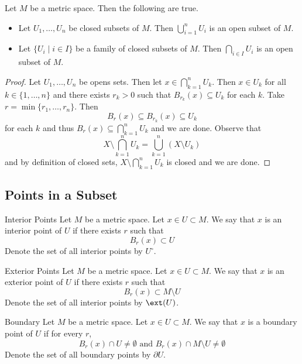 \documentclass[a4paper]{article}
\begin{document}
\begin{prp}{}{} Let $M$ be a metric space. Then the following are true. 
\begin{itemize}
\item Let $U_1,\dots,U_n$ be closed subsets of $M$. Then $\bigcup_{i=1}^nU_i$ is an open subset of $M$. 
\item Let $\{U_i\;|\;i\in I\}$ be a family of closed subsets of $M$. Then $\bigcap_{i\in I}U_i$ is an open subset of $M$. 
\end{itemize} \tcbline
\begin{proof}
Let $U_1,\dots,U_n$ be opens sets. Then let $x\in\bigcap_{k=1}^nU_k$. Then $x\in U_k$ for all $k\in\{1,\dots,n\}$ and there exists $r_k>0$ such that $B_{r_k}(x)\subseteq U_k$ for each $k$. Take $r=\min\{r_1,\dots,r_n\}$. Then $$B_r(x)\subseteq B_{r_k}(x)\subseteq U_k$$ for each $k$ and thus $B_r(x)\subseteq\bigcap_{k=1}^nU_k$ and we are done. \linebreak\linebreak
Observe that $$X\setminus\bigcap_{k=1}^nU_k=\bigcup_{k=1}^n(X\setminus U_k)$$ and by definition of closed sets, $X\setminus\bigcap_{k=1}^nU_k$ is closed and we are done. 
\end{proof}
\end{prp}

\subsection{Points in a Subset}
\begin{defn}{Interior Points}{} Let $M$ be a metric space. Let $x\in U\subset M$. We say that $x$ is an interior point of $U$ if there exists $r$ such that $$B_r(x)\subset U$$ Denote the set of all interior points by $U^\circ$. 
\end{defn}

\begin{defn}{Exterior Points}{} Let $M$ be a metric space. Let $x\in U\subset M$. We say that $x$ is an exterior point of $U$ if there exists $r$ such that $$B_r(x)\subset M\setminus U$$ Denote the set of all interior points by $\ext(U)$. 
\end{defn}

\begin{defn}{Boundary}{} Let $M$ be a metric space. Let $x\in U\subset M$. We say that $x$ is a boundary point of $U$ if for every $r$, $$B_r(x)\cap U\neq\emptyset\text{ and }B_r(x)\cap M\setminus U\neq\emptyset$$ Denote the set of all boundary points by $\partial U$. 
\end{defn}
\end{document}
